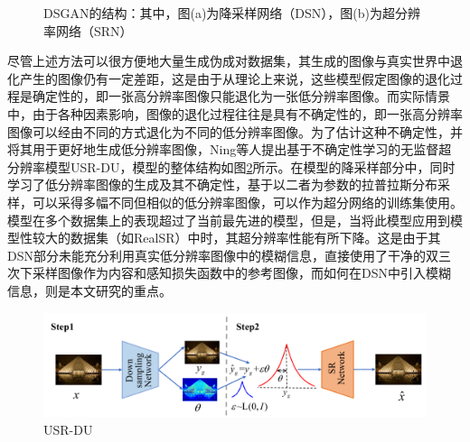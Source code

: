 \begin{figure}[htbp]
    \hfill
    \caption{DSGAN的结构：其中，图(a)为降采样网络（DSN），图(b)为超分辨率网络（SRN）}	
    \label{fig:DSGAN}
\end{figure}

尽管上述方法可以很方便地大量生成伪成对数据集，其生成的图像与真实世界中退化产生的图像仍有一定差距，这是由于从理论上来说，这些模型假定图像的退化过程是确定性的，即一张高分辨率图像只能退化为一张低分辨率图像。而实际情景中，由于各种因素影响，图像的退化过程往往是具有不确定性的，即一张高分辨率图像可以经由不同的方式退化为不同的低分辨率图像。为了估计这种不确定性，并将其用于更好地生成低分辨率图像，Ning等人\cite{ijcai2022p176}提出基于不确定性学习的无监督超分辨率模型USR-DU，模型的整体结构如图\ref{fig:USR-DU}所示。在模型的降采样部分中，同时学习了低分辨率图像的生成及其不确定性，基于以二者为参数的拉普拉斯分布采样，可以采得多幅不同但相似的低分辨率图像，可以作为超分网络的训练集使用。模型在多个数据集上的表现超过了当前最先进的模型，但是，当将此模型应用到模型性较大的数据集（如RealSR）中时，其超分辨率性能有所下降。这是由于其DSN部分未能充分利用真实低分辨率图像中的模糊信息，直接使用了干净的双三次下采样图像作为内容和感知损失函数中的参考图像，而如何在DSN中引入模糊信息，则是本文研究的重点。



\begin{figure}[htbp]
    \centering
    \includegraphics[width=1.0\textwidth]{imgs/USR-DU.png}
    \caption{USR-DU}
    \label{fig:USR-DU}
\end{figure}




